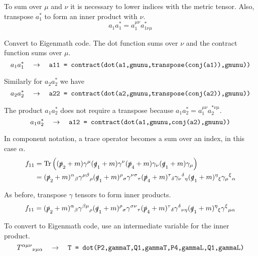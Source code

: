 \documentclass[12pt]{article}
\begin{document}
To sum over $\mu$ and $\nu$ it is necessary to lower indices with the metric tensor.
Also, transpose $a_1^*$ to form an inner product with $\nu$.
\begin{equation*}
a_1a_1^*=a_1^{\mu\nu}a_{1\nu\mu}^*
\end{equation*}

Convert to Eigenmath code.
The dot function sums over $\nu$ and the contract function sums over $\mu$.
\begin{equation*}
a_1a_1^*
\quad\rightarrow\quad
\text{\tt a11 = contract(dot(a1,gmunu,transpose(conj(a1)),gmunu))}
\end{equation*}

Similarly for $a_2a_2^*$ we have
\begin{equation*}
a_2a_2^*
\quad\rightarrow\quad
\text{\tt a22 = contract(dot(a2,gmunu,transpose(conj(a2)),gmunu))}
\end{equation*}

The product $a_1a_2^*$ does not require a transpose because $a_1a_2^*=a_1^{\mu\nu}a_2^{*\nu\mu}$.
\begin{equation*}
a_1a_2^*
\quad\rightarrow\quad
\text{\tt a12 = contract(dot(a1,gmunu,conj(a2),gmunu))}
\end{equation*}

In component notation, a trace operator becomes a sum over an index, in this case $\alpha$.
\begin{align*}
f_{11}
&=
\mathop{\rm Tr}
\left(
(\slashed{p}_2+m)\gamma^\mu(\slashed{q}_1+m)\gamma^\nu(\slashed{p}_4+m)\gamma_\nu(\slashed{q}_1+m)\gamma_\mu
\right)\\
&=
(\slashed{p}_2+m)^\alpha{}_\beta
\gamma^{\mu\beta}{}_\rho
(\slashed{q}_1+m)^\rho{}_\sigma
\gamma^{\nu\sigma}{}_\tau
(\slashed{p}_4+m)^\tau{}_\delta
\gamma_\nu{}^\delta{}_\eta
(\slashed{q}_1+m)^\eta{}_\xi
\gamma_\mu{}^\xi{}_\alpha
\end{align*}

As before, transpose $\gamma$ tensors to form inner products.
\begin{equation*}
f_{11}=
(\slashed{p}_2+m)^\alpha{}_\beta
\gamma^{\beta\mu}{}_\rho
(\slashed{q}_1+m)^\rho{}_\sigma
\gamma^{\sigma\nu}{}_\tau
(\slashed{p}_4+m)^\tau{}_\delta
\gamma^\delta{}_{\nu\eta}
(\slashed{q}_1+m)^\eta{}_\xi
\gamma^\xi{}_{\mu\alpha}
\end{equation*}

To convert to Eigenmath code, use an intermediate variable for the inner product.
\begin{equation*}
T^{\alpha\mu\nu}{}_{\nu\mu\alpha}
\quad\rightarrow\quad
\text{\tt T = dot(P2,gammaT,Q1,gammaT,P4,gammaL,Q1,gammaL)}
\end{equation*}
\end{document}
